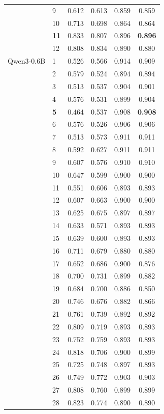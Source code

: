 \begin{longtable}{llcccc}
 & 9 & 0.612 & 0.613 & 0.859 & 0.859 \\
 & 10 & 0.713 & 0.698 & 0.864 & 0.864 \\
 & \textbf{11} & 0.833 & 0.807 & 0.896 & \textbf{0.896} \\
 & 12 & 0.808 & 0.834 & 0.890 & 0.880 \\
\midrule
Qwen3-0.6B & 1 & 0.526 & 0.566 & 0.914 & 0.909 \\
 & 2 & 0.579 & 0.524 & 0.894 & 0.894 \\
 & 3 & 0.513 & 0.537 & 0.904 & 0.901 \\
 & 4 & 0.576 & 0.531 & 0.899 & 0.904 \\
 & \textbf{5} & 0.464 & 0.537 & 0.908 & \textbf{0.908} \\
 & 6 & 0.576 & 0.526 & 0.906 & 0.906 \\
 & 7 & 0.513 & 0.573 & 0.911 & 0.911 \\
 & 8 & 0.592 & 0.627 & 0.911 & 0.911 \\
 & 9 & 0.607 & 0.576 & 0.910 & 0.910 \\
 & 10 & 0.647 & 0.599 & 0.900 & 0.900 \\
 & 11 & 0.551 & 0.606 & 0.893 & 0.893 \\
 & 12 & 0.607 & 0.663 & 0.900 & 0.900 \\
 & 13 & 0.625 & 0.675 & 0.897 & 0.897 \\
 & 14 & 0.633 & 0.571 & 0.893 & 0.893 \\
 & 15 & 0.639 & 0.600 & 0.893 & 0.893 \\
 & 16 & 0.711 & 0.679 & 0.880 & 0.880 \\
 & 17 & 0.652 & 0.686 & 0.900 & 0.876 \\
 & 18 & 0.700 & 0.731 & 0.899 & 0.882 \\
 & 19 & 0.684 & 0.700 & 0.886 & 0.850 \\
 & 20 & 0.746 & 0.676 & 0.882 & 0.866 \\
 & 21 & 0.761 & 0.739 & 0.892 & 0.892 \\
 & 22 & 0.809 & 0.719 & 0.893 & 0.893 \\
 & 23 & 0.752 & 0.759 & 0.893 & 0.893 \\
 & 24 & 0.818 & 0.706 & 0.900 & 0.899 \\
 & 25 & 0.725 & 0.748 & 0.897 & 0.893 \\
 & 26 & 0.749 & 0.772 & 0.903 & 0.903 \\
 & 27 & 0.808 & 0.760 & 0.899 & 0.899 \\
 & 28 & 0.823 & 0.774 & 0.890 & 0.890 \\

\end{longtable}
